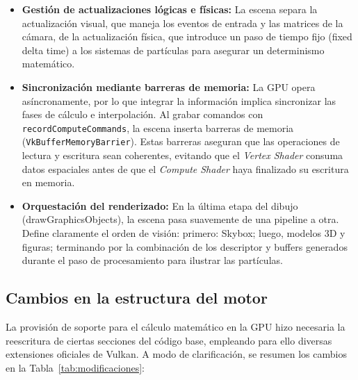\begin{itemize}
    \item \textbf{Gestión de actualizaciones lógicas e físicas:} La escena separa la actualización visual, que maneja los eventos de entrada y las matrices de la cámara, de la actualización física, que introduce un paso de tiempo fijo (fixed delta time) a los sistemas de partículas para asegurar un determinismo matemático.

    \item \textbf{Sincronización mediante barreras de memoria:} La GPU opera asíncronamente, por lo que integrar la información implica sincronizar las fases de cálculo e interpolación. Al grabar comandos con \texttt{recordComputeCommands}, la escena inserta barreras de memoria (\texttt{VkBufferMemoryBarrier}). Estas barreras aseguran que las operaciones de lectura y escritura sean coherentes, evitando que el \textit{Vertex Shader} consuma datos espaciales antes de que el \textit{Compute Shader} haya finalizado su escritura en memoria.             

    \item \textbf{Orquestación del renderizado:} En la última etapa del dibujo (drawGraphicsObjects), la
escena pasa suavemente de una pipeline a otra. Define claramente el orden de visión:
primero: Skybox; luego, modelos 3D y figuras; terminando por la combinación de los
descriptor y buffers generados durante el paso de procesamiento para ilustrar las partículas.
\end{itemize}



\subsection{Cambios en la estructura del motor}

La provisión de soporte para el cálculo matemático en la GPU hizo necesaria la reescritura de ciertas secciones del código base, empleando para ello diversas extensiones oficiales de Vulkan. A modo de clarificación, se resumen los cambios en la Tabla~\ref{tab:modificaciones}:

